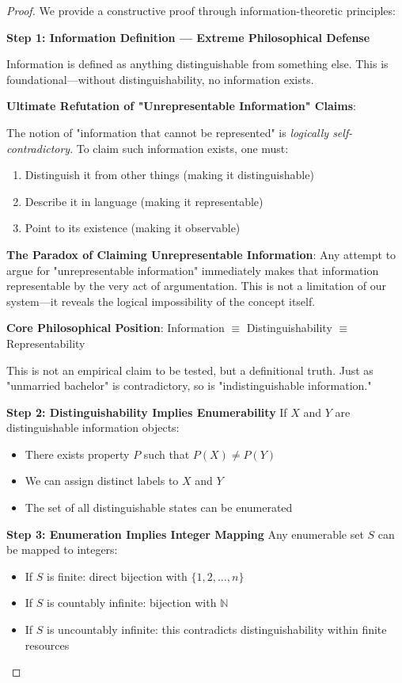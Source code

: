 \documentclass[12pt,letterpaper]{article}
\begin{document}
\begin{proof}
We provide a constructive proof through information-theoretic principles:

\textbf{Step 1: Information Definition — Extreme Philosophical Defense}

Information is defined as anything distinguishable from something else. This is foundational—without distinguishability, no information exists.

\textbf{Ultimate Refutation of "Unrepresentable Information" Claims}:

The notion of "information that cannot be represented" is \textit{logically self-contradictory}. To claim such information exists, one must:
\begin{enumerate}
\item Distinguish it from other things (making it distinguishable)
\item Describe it in language (making it representable)  
\item Point to its existence (making it observable)
\end{enumerate}

\textbf{The Paradox of Claiming Unrepresentable Information}:
Any attempt to argue for "unrepresentable information" immediately makes that information representable by the very act of argumentation. This is not a limitation of our system—it reveals the logical impossibility of the concept itself.

\textbf{Core Philosophical Position}: Information $\equiv$ Distinguishability $\equiv$ Representability

This is not an empirical claim to be tested, but a definitional truth. Just as "unmarried bachelor" is contradictory, so is "indistinguishable information."

\textbf{Step 2: Distinguishability Implies Enumerability}
If $X$ and $Y$ are distinguishable information objects:
\begin{itemize}
\item There exists property $P$ such that $P(X) \neq P(Y)$
\item We can assign distinct labels to $X$ and $Y$
\item The set of all distinguishable states can be enumerated
\end{itemize}

\textbf{Step 3: Enumeration Implies Integer Mapping}
Any enumerable set $S$ can be mapped to integers:
\begin{itemize}
\item If $S$ is finite: direct bijection with $\{1, 2, \ldots, n\}$
\item If $S$ is countably infinite: bijection with $\mathbb{N}$
\item If $S$ is uncountably infinite: this contradicts distinguishability within finite resources
\end{itemize}


\end{proof}
\end{document}
